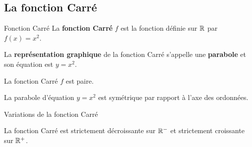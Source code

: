
\begin{pageCours} %


\subsection{La fonction Carré}

\begin{DefT}{Fonction Carré}
La \textbf{fonction Carré} $f$ est la fonction définie sur $\mathbb R$ par $f(x)=x^2$.
 
La \textbf{représentation graphique} de la fonction Carré s'appelle une \textbf{parabole} et son équation est $y=x^2$. 
\end{DefT}

\begin{minipage}{0.48\linewidth}
\begin{Th} 
La fonction Carré $f$ est paire.

La parabole d'équation $y=x^2$ est symétrique par rapport à l'axe des ordonnées.
\end{Th}


\begin{ThT}{Variations de la fonction Carré}

La fonction Carré est strictement décroissante sur $\mathbb R^-$ et strictement croissante sur $\mathbb R^+$. 


\end{ThT}

\end{minipage}
\hfill
\begin{minipage}{0.48\linewidth}


\end{minipage}
\end{pageCours}
